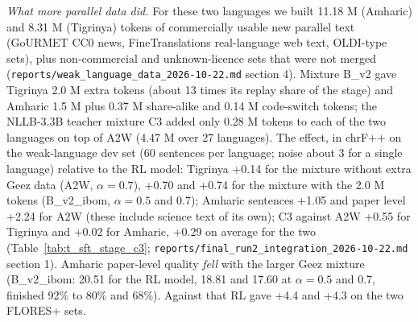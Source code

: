 \emph{What more parallel data did.} For these two languages we built 11.18 M (Amharic) and 8.31 M (Tigrinya) tokens of commercially usable new parallel text (GoURMET CC0 news, FineTranslations real-language web text, OLDI-type sets), plus non-commercial and unknown-licence sets that were not merged (\texttt{reports/weak\_language\_data\_2026-10-22.md} section 4). Mixture B\_v2 gave Tigrinya 2.0 M extra tokens (about 13 times its replay share of the stage) and Amharic 1.5 M plus 0.37 M share-alike and 0.14 M code-switch tokens; the NLLB-3.3B teacher mixture C3 added only 0.28 M tokens to each of the two languages on top of A2W (4.47 M over 27 languages). The effect, in chrF++ on the weak-language dev set (60 sentences per language; noise about 3 for a single language) relative to the RL model: Tigrinya +0.14 for the mixture without extra Ge\textquotesingle ez data (A2W, \(\alpha=0.7\)), +0.70 and +0.74 for the mixture with the 2.0 M tokens (B\_v2\_ibom, \(\alpha=0.5\) and 0.7); Amharic sentences +1.05 and paper level +2.24 for A2W (these include science text of its own); C3 against A2W +0.55 for Tigrinya and +0.02 for Amharic, +0.29 on average for the two (Table~\ref{tab:t_sft_stage_c3}; \texttt{reports/final\_run2\_integration\_2026-10-22.md} section 1). Amharic paper-level quality \emph{fell} with the larger Ge\textquotesingle ez mixture (B\_v2\_ibom: 20.51 for the RL model, 18.81 and 17.60 at \(\alpha=0.5\) and 0.7, finished 92\% to 80\% and 68\%). Against that RL gave +4.4 and +4.3 on the two FLORES+ sets.

